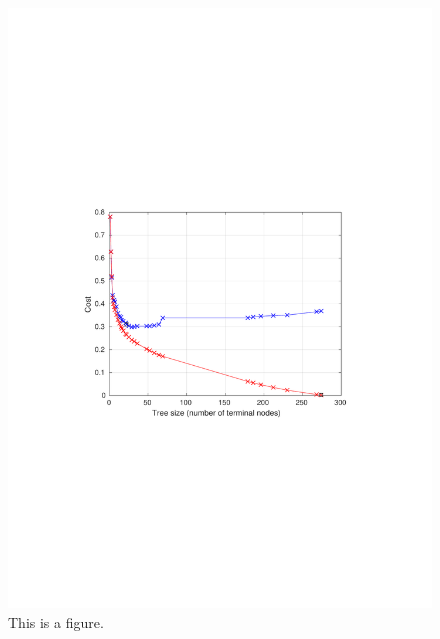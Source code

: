  \begin{figure}[htb]
  \begin{center}
    \caption{This is a figure.}
  \includegraphics[scale = 0.80]{graphs/noisy_dataset/noisy_pruning.pdf} 

  \end{center}
  \end{figure}
